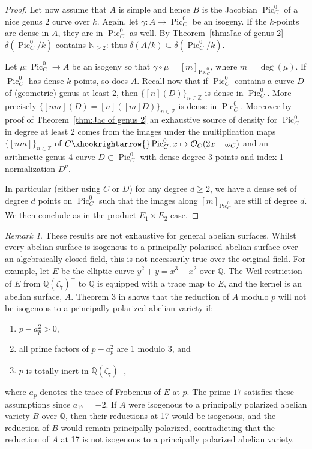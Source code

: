 \documentclass[a4paper,11pt]{amsart}
\theoremstyle{plain}
\theoremstyle{remark}
\newtheorem{remark}[thm]{Remark}
\newcommand{\Pic}{\operatorname{Pic}}
\newcommand{\dendegs}{\delta}
\begin{document}
\begin{proof}
    Let now assume that $A$ is simple and hence $B$ is the Jacobian $\Pic^0_C$ of a nice genus 2 curve over $k$.
    Again, let $\gamma:A\to \Pic^0_C$ be an isogeny. 
    If the $k$-points are dense in $A$, they are in $\Pic^0_C$ as well.
    By Theorem~\ref{thm:Jac of genus 2} $\dendegs(\Pic^0_C/k)$ contains $\mathbb{N}_{\geq 2}$: thus $\dendegs(A/k)\subseteq \dendegs(\Pic^0_C/k)$.
    
    Let $\mu:\Pic^0_C\to A$ be an isogeny so that $\gamma\circ \mu = [m]_{\Pic^0_C}$, where $m=\deg(\mu)$.
    If $\Pic^0_C$ has dense $k$-points, so does $A$.
    Recall now that if $\Pic^0_C$ contains a curve $D$ of (geometric) genus at least 2, then $\{[n](D)\}_{n\in \mathbb{Z}}$ is dense in $\Pic^0_C$.
    More precisely $\{[nm](D)= [n]([m]D)\}_{n\in \mathbb{Z}}$ is dense in $\Pic^0_C$.
    Moreover by proof of Theorem~\ref{thm:Jac of genus 2} an exhaustive source of density for $\Pic^0_C$ in degree at least 2 comes from the images under the multiplication maps $\{[nm]\}_{n\in \mathbb{Z}}$ of $C\xhookrightarrow{} \Pic^0_C, x\mapsto \mathcal{O}_C(2x-\omega_C)$ and an arithmetic genus 4 curve $D\subset \Pic^0_C$ with dense degree 3 points and index 1 normalization $D^{\nu}$.

    In particular (either using $C$ or $D$) for any degree $d\geq 2$, we have a dense set of degree $d$ points on $\Pic^0_C$ such that the images along $[m]_{\Pic^0_C}$ are still of degree $d$. 
    We then conclude as in the product $E_1\times E_2$ case.
\end{proof}

\begin{remark}
    These results are not exhaustive for general abelian surfaces. Whilst every abelian surface is isogenous to a principally polarised abelian surface over an algebraically closed field, this is not necessarily true over the original field. 
    For example, let $E$ be the elliptic curve $y^2 + y = x^3 - x^2$ over $\mathbb{Q}$. The Weil restriction of $E$ from $\mathbb{Q}(\zeta_7)^+$ to $\mathbb{Q}$ is equipped with a trace map to $E$, and the kernel is an abelian surface, $A$. 
    Theorem 3 in \cite{hmnr08} shows that the reduction of $A$ modulo $p$ will not be isogenous to a principally polarized abelian variety if:
    \begin{enumerate}
        \item $p - a_p^2 > 0$,
        \item all prime factors of $p - a_p^2$ are 1 modulo 3, and
        \item $p$ is totally inert in $\mathbb{Q}(\zeta_7)^+$,
    \end{enumerate}    
    where $a_p$ denotes the trace of Frobenius of $E$ at $p$. 
    The prime $17$ satisfies these assumptions since $a_{17} = -2$. If $A$ were isogenous to a principally polarized abelian variety $B$ over $\mathbb{Q}$, then their reductions at 17 would be isogenous, and the reduction of $B$ would remain principally polarized, contradicting that the reduction of $A$ at 17 is not isogenous to a principally polarized abelian variety.
\end{remark}

\printbibliography
\end{document}
